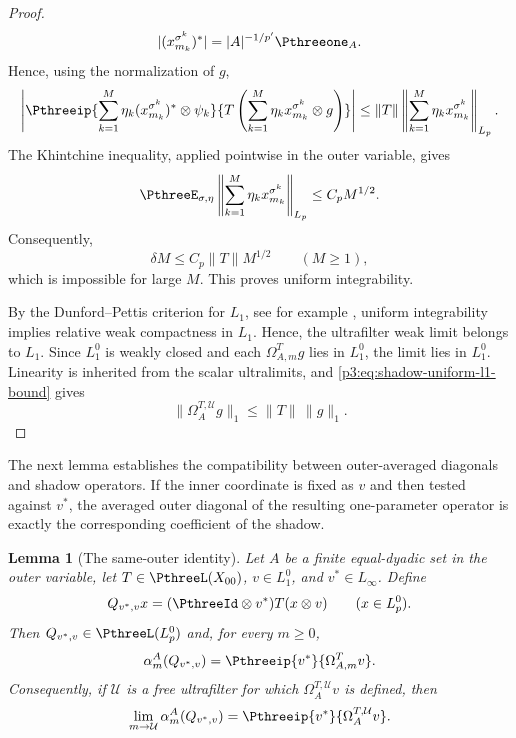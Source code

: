 \documentclass[11pt,reqno]{amsart}
\makeatletter
\theoremstyle{plain}
\newtheorem{lemma}[lemma]{Lemma}
\theoremstyle{definition}
\newcounter{problempaper}
\newenvironment{problempaperbody}{%
  \setcounter{subsection}{0}%
  \setcounter{subsubsection}{0}%
  \setcounter{paragraph}{0}%
  \renewcommand{\thesubsection}{\arabic{subsection}}%
  \renewcommand{\thesubsubsection}{\thesubsection.\arabic{subsubsection}}%
  \renewcommand{\theparagraph}{\thesubsubsection.\arabic{paragraph}}%
  \let\problem@outersection\section
  \let\problem@outersubsection\subsection
  \let\problem@outersubsubsection\subsubsection
  \let\problem@outerparagraph\paragraph
  \let\section\problem@papersection
  \let\subsection\problem@papersubsection
  \let\subsubsection\problem@papersubsubsection
}{%
  \let\section\problem@outersection
  \let\subsection\problem@outersubsection
  \let\subsubsection\problem@outersubsubsection
  \let\paragraph\problem@outerparagraph
}
\newcommand{\problem@target}[2]{%
  \hypertarget{problem-\theproblempaper-#1-#2}{}%
}
\newcommand{\problem@paperheading}[3]{%
  \par\bigskip
  \problem@target{#1}{#2}%
  \noindent{\large\bfseries #2.\quad #3\par}%
  \nobreak\smallskip
}
\newcommand{\problem@papersubheading}[3]{%
  \par\medskip
  \problem@target{#1}{#2}%
  \noindent{\normalsize\bfseries #2.\quad #3\par}%
  \nobreak\smallskip
}
\newcommand{\problem@papersubsubheading}[3]{%
  \par\smallskip
  \problem@target{#1}{#2}%
  \noindent{\normalsize\itshape #2.\quad #3.\ }%
}
\def\problem@papersection{%
  \@ifstar{\problem@papersectionstar}{\problem@papersectionnostar}%
}
\def\problem@papersectionstar#1{%
  \par\bigskip\noindent{\large\bfseries #1\par}\nobreak\smallskip
}
\def\problem@papersectionnostar#1{%
  \refstepcounter{subsection}%
  \setcounter{subsubsection}{0}%
  \setcounter{paragraph}{0}%
  \problem@paperheading{section}{\thesubsection}{#1}%
  \problem@writecontentsline{section}{\thesubsection}{#1}%
}
\def\problem@papersubsection{%
  \@ifstar{\problem@papersubsectionstar}{\problem@papersubsectionnostar}%
}
\def\problem@papersubsectionstar#1{%
  \par\medskip\noindent{\normalsize\bfseries #1\par}\nobreak\smallskip
}
\def\problem@papersubsectionnostar#1{%
  \refstepcounter{subsubsection}%
  \setcounter{paragraph}{0}%
  \problem@papersubheading{subsection}{\thesubsubsection}{#1}%
  \problem@writecontentsline{subsection}{\thesubsubsection}{#1}%
}
\def\problem@papersubsubsection{%
  \@ifstar{\problem@papersubsubsectionstar}{\problem@papersubsubsectionnostar}%
}
\def\problem@papersubsubsectionstar#1{%
  \par\smallskip\noindent{\normalsize\itshape #1.\ }%
}
\def\problem@papersubsubsectionnostar#1{%
  \refstepcounter{paragraph}%
  \problem@papersubsubheading{subsubsection}{\theparagraph}{#1}%
  \problem@writecontentsline{subsubsection}{\theparagraph}{#1}%
}
\newcommand{\problem@writecontentsline}[3]{%
  \begingroup
  \protected@write\@auxout{}{%
    \string\problemcontentsentry{\theproblempaper}{#1}{#2}{#3}{\thepage}%
  }%
  \endgroup
}
\newcommand{\problemcontentsentry}[5]{%
  \@ifundefined{problemcontents@#1}{%
    \expandafter\gdef\csname problemcontents@#1\endcsname{}%
  }{}%
  \expandafter\g@addto@macro\csname problemcontents@#1\endcsname{%
    \problemcontentsline{#1}{#2}{#3}{#4}{#5}%
  }%
}
\newcommand{\problemcontentslink}[4]{%
  \hyperlink{problem-#1-#2-#3}{#4}%
}
\newcommand{\problemcontentsline}[5]{%
  \ifstrequal{#2}{section}{%
    \par\noindent
    \problemcontentslink{#1}{#2}{#3}{\makebox[2.5em][l]{#3}#4}%
    \nobreak\dotfill
    \problemcontentslink{#1}{#2}{#3}{#5}\par
  }{%
    \ifstrequal{#2}{subsection}{%
      \par\noindent\hspace*{1.5em}%
      \problemcontentslink{#1}{#2}{#3}{\makebox[3.5em][l]{#3}#4}%
      \nobreak\dotfill
      \problemcontentslink{#1}{#2}{#3}{#5}\par
    }{%
      \par\noindent\hspace*{3em}%
      \problemcontentslink{#1}{#2}{#3}{\makebox[4.5em][l]{#3}#4}%
      \nobreak\dotfill
      \problemcontentslink{#1}{#2}{#3}{#5}\par
    }%
  }%
}
\makeatother
\begin{document}
\begin{problempaperbody}
\begin{proof}
\begin{equation*}
        |(x_{m_k}^{\sigma^k})^*|=|A|^{-1/p'}\Pthreeone_A.
\end{equation*}
Hence, using the normalization of $g$,
\begin{equation*}
        \left|\Pthreeip{\sum_{k=1}^M\eta_k(x_{m_k}^{\sigma^k})^*\otimes\psi_k}{T\left(\sum_{k=1}^M\eta_kx_{m_k}^{\sigma^k}\otimes g\right)}\right|\leq\|T\|\left\|\sum_{k=1}^M\eta_kx_{m_k}^{\sigma^k}\right\|_{L_p}.
\end{equation*}
The Khintchine inequality, applied pointwise in the outer variable, gives
\begin{equation*}
        \PthreeE_{\sigma,\eta}\left\|\sum_{k=1}^M\eta_kx_{m_k}^{\sigma^k}\right\|_{L_p}\leq C_pM^{1/2}.
\end{equation*}
Consequently,
\begin{equation*}
        \delta M\leq C_p\|T\|M^{1/2}\qquad(M\geq1),
\end{equation*}
which is impossible for large $M$. This proves uniform integrability.

By the Dunford--Pettis criterion for $L_1$, see for example \cite[Theorem~5.2.9]{AlbiacKalton2016}, uniform integrability implies relative weak compactness in $L_1$. Hence, the ultrafilter weak limit belongs to $L_1$. Since $L_1^0$ is weakly closed and each $\Omega_{A,m}^Tg$ lies in $L_1^0$, the limit lies in $L_1^0$. Linearity is inherited from the scalar ultralimits, and \eqref{p3:eq:shadow-uniform-l1-bound} gives
\begin{equation*}
        \|\Omega_A^{T,\mathcal U}g\|_1\leq\|T\|\,\|g\|_1.
\end{equation*}
\end{proof}

The next lemma establishes the compatibility between outer-averaged diagonals and shadow operators. If the inner coordinate is fixed as $v$ and then tested against $v^*$, the averaged outer diagonal of the resulting one-parameter operator is exactly the corresponding coefficient of the shadow.

\begin{lemma}[The same-outer identity]
\label{p3:lem:same-outer-identity}
Let $A$ be a finite equal-dyadic set in the outer variable, let $T\in\PthreeL(X_{00})$, $v\in L_1^0$, and $v^*\in L_\infty$. Define
\begin{equation*}
        Q_{v^*,v}x=(\PthreeId\otimes v^*)T(x\otimes v)\qquad (x\in L_p^0).
\end{equation*}
Then $Q_{v^*,v}\in\PthreeL(L_p^0)$ and, for every $m\geq0$,
\begin{equation}
\label{p3:eq:same-outer-identity}
        \alpha_m^A(Q_{v^*,v})=\Pthreeip{v^*}{\Omega_{A,m}^Tv}.
\end{equation}
Consequently, if $\mathcal U$ is a free ultrafilter for which $\Omega_A^{T,\mathcal U}v$ is defined, then
\begin{equation*}
        \lim_{m\to\mathcal U}\alpha_m^A(Q_{v^*,v})=\Pthreeip{v^*}{\Omega_A^{T,\mathcal U}v}.
\end{equation*}
\end{lemma}


\end{problempaperbody}
\end{document}
